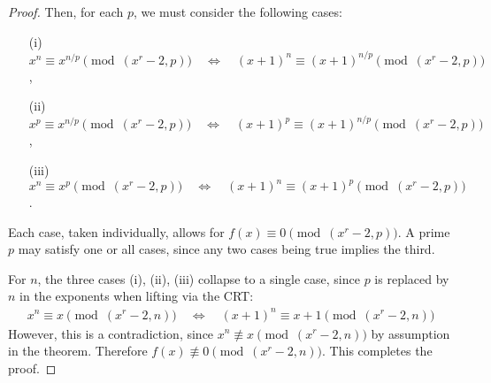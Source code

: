 \begin{proof}
Then, for each $p$, we must consider the following cases:
\begin{enumerate}
\item[(i)] $x^n \equiv x^{n/p} \pmod{(x^r-2, p)} \quad\Longleftrightarrow\quad (x+1)^{n} \equiv (x+1)^{n/p} \pmod{(x^r-2, p)}$,
\item[(ii)] $x^p \equiv x^{n/p} \pmod{(x^r-2, p)} \quad\Longleftrightarrow\quad (x+1)^p \equiv (x+1)^{n/p} \pmod{(x^r-2, p)}$,
\item[(iii)] $x^n \equiv x^p \pmod{(x^r-2, p)} \quad\Longleftrightarrow\quad (x+1)^n \equiv (x+1)^p \pmod{(x^r-2, p)}$.
\end{enumerate}
Each case, taken individually, allows for $f(x) \equiv 0 \pmod{(x^r-2,p)}$. A prime $p$ may satisfy one or all cases, since any two cases being true implies the third.

For $n$, the three cases (i), (ii), (iii) collapse to a single case, since $p$ is replaced by $n$ in the exponents when lifting via the CRT:
\begin{align*}
x^n \equiv x \pmod{(x^r-2, n)} \quad\Longleftrightarrow\quad (x+1)^n \equiv x+1 \pmod{(x^r-2, n)}
\end{align*}
However, this is a contradiction, since $x^n \not\equiv x \pmod{(x^r-2, n)}$ by assumption in the theorem. Therefore $f(x) \not\equiv 0 \pmod{(x^r-2, n)}$. This completes the proof.
\end{proof}